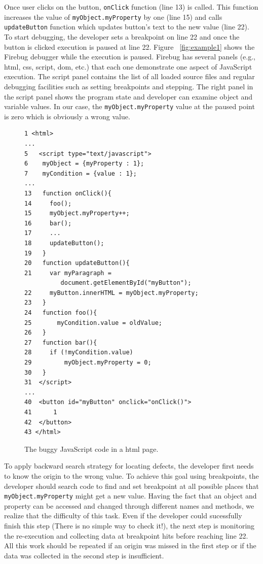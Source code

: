 \documentclass[preprint]{sigplanconf}
\begin{document}
Once user clicks on the button, \texttt{onClick} function (line 13) is called. This function increases the value of \texttt{myObject.myProperty} by one (line 15) and calls \texttt{updateButton} function which updates button's text to the new value (line 22). To start debugging, the developer sets a breakpoint on line 22 and once the button is clicked execution is paused at line 22. Figure ~\ref{fig:example1} shows the Firebug debugger while the execution is paused. Firebug has several panels (e.g., html, css, script, dom, etc.) that each one demonstrate one aspect of JavaScript execution. The script panel contains the list of all loaded source files and regular debugging facilities such as setting breakpoints and stepping. The right panel in the script panel shows the program state and developer can examine object and variable values. In our case, the \texttt{myObject.myProperty} value at the paused point is zero which is obviously a wrong value. 

\begin{figure}[htp]
\begin{verbatim}
1 <html>
...
5   <script type="text/javascript">
6    myObject = {myProperty : 1};
7    myCondition = {value : 1};
...
13   function onClick(){
14     foo();
15     myObject.myProperty++;
16     bar();
17     ...
18     updateButton();
19   }
20   function updateButton(){
21     var myParagraph =
          document.getElementById("myButton");
22     myButton.innerHTML = myObject.myProperty;
23   }   
24   function foo(){
25  	 myCondition.value = oldValue;
26   }  
27   function bar(){ 
28     if (!myCondition.value)
29         myObject.myProperty = 0;
30   }
31  </script> 
...
40  <button id="myButton" onclick="onClick()">
41  	1 
42  </button>
43 </html>
\end{verbatim}
\caption{The buggy JavaScript code in a html page.}
\label{fig:js-code}
\end{figure}

To apply backward search strategy for locating defects, the developer first needs to know the origin to the wrong value. To achieve this goal using breakpoints, the developer should search code to find and set breakpoint at all possible places that \texttt{myObject.myProperty} might get a new value. Having the fact that an object and property can be accessed and changed through different names and methods, we realize that the difficulty of this task. Even if the developer could sucessfully finish this step (There is no simple way to check it!), the next step is monitoring the re-execution and collecting data at breakpoint hits before reaching line 22. All this work should be repeated if an origin was missed in the first step or if the data was collected in the second step is insufficient.
\end{document}
